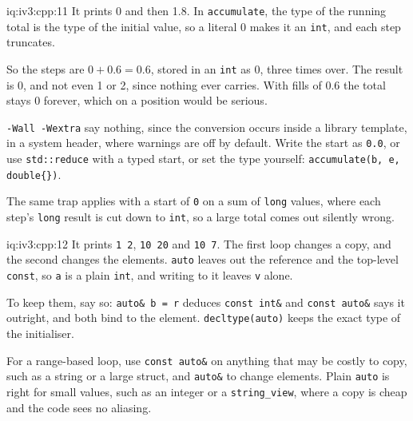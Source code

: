 \begin{solution}{iq:iv3:cpp:11}
It prints 0 and then 1.8. In \texttt{accumulate}, the type of the running total is the type of the initial value, so a literal 0 makes it an \texttt{int}, and each step truncates.

So the steps are $0 + 0.6 = 0.6$, stored in an \texttt{int} as 0, three times over. The result is 0, and not even 1 or 2, since nothing ever carries. With fills of 0.6 the total stays 0 forever, which on a position would be serious.

\texttt{-Wall -Wextra} say nothing, since the conversion occurs inside a library template, in a system header, where warnings are off by default. Write the start as \texttt{0.0}, or use \texttt{std::reduce} with a typed start, or set the type yourself: \texttt{accumulate(b, e, double\{\})}.

The same trap applies with a start of \texttt{0} on a sum of \texttt{long} values, where each step's \texttt{long} result is cut down to \texttt{int}, so a large total comes out silently wrong.

\end{solution}

\begin{solution}{iq:iv3:cpp:12}
It prints \texttt{1 2}, \texttt{10 20} and \texttt{10 7}. The first loop changes a copy, and the second changes the elements. \texttt{auto} leaves out the reference and the top-level \texttt{const}, so \texttt{a} is a plain \texttt{int}, and writing to it leaves \texttt{v} alone.

To keep them, say so: \texttt{auto\& b = r} deduces \texttt{const int\&} and \texttt{const auto\&} says it outright, and both bind to the element. \texttt{decltype(auto)} keeps the exact type of the initialiser.

For a range-based loop, use \texttt{const auto\&} on anything that may be costly to copy, such as a string or a large struct, and \texttt{auto\&} to change elements. Plain \texttt{auto} is right for small values, such as an integer or a \texttt{string\_view}, where a copy is cheap and the code sees no aliasing.

\end{solution}

